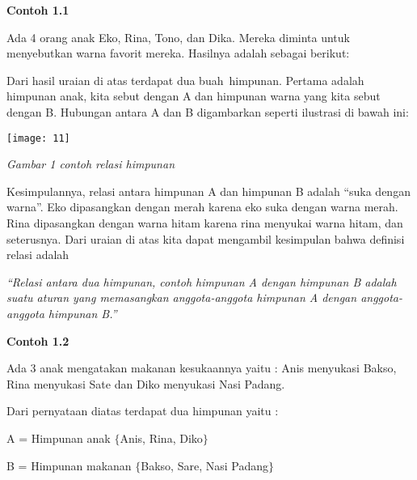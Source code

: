 \documentclass[11pt,fleqn]{book} %
\begin{document}
\noindent 

\noindent \textbf{Contoh 1.1}

\noindent Ada 4 orang anak Eko, Rina, Tono, dan Dika. Mereka diminta untuk menyebutkan warna favorit mereka. Hasilnya adalah sebagai berikut:

\noindent 

\noindent 

\noindent 

\noindent 

\noindent 

\noindent 

\noindent Dari hasil uraian di atas terdapat dua buah~himpunan. Pertama adalah himpunan anak, kita sebut dengan A dan himpunan warna yang kita sebut dengan B. Hubungan antara A dan B digambarkan seperti ilustrasi di bawah ini:

\noindent 

\begin{center}
\noindent \texttt{[image: 11]}
\end{center}

\noindent \textit{Gambar 1 contoh relasi himpunan}

\noindent 

\noindent Kesimpulannya, relasi antara himpunan A dan himpunan B adalah ``suka dengan warna''. Eko dipasangkan dengan merah karena eko suka dengan warna merah. Rina dipasangkan dengan warna hitam karena rina menyukai warna hitam, dan seterusnya. Dari uraian di atas kita dapat mengambil kesimpulan bahwa definisi relasi adalah

\noindent 

\noindent \textit{``Relasi antara dua himpunan, contoh himpunan A dengan himpunan B adalah suatu aturan yang memasangkan anggota-anggota himpunan A dengan anggota-anggota himpunan B.''}

\noindent 

\noindent 

\noindent \textbf{Contoh 1.2}

\noindent Ada 3 anak mengatakan makanan kesukaannya yaitu : Anis menyukasi Bakso, Rina menyukasi Sate dan Diko menyukasi Nasi Padang.

\noindent 

\noindent Dari pernyataan diatas terdapat dua himpunan yaitu :

\noindent A = Himpunan anak $\{$Anis, Rina, Diko$\}$

\noindent B = Himpunan makanan $\{$Bakso, Sare, Nasi Padang$\}$
\end{document}
